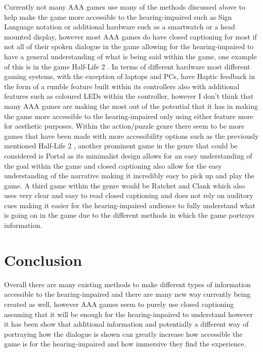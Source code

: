 \documentclass{scrartcl}
\begin{document}
Currently not many AAA games use many of the methods discussed above to help make the game more accessible to the hearing-impaired such as Sign Language notation or additional hardware such as a smartwatch or a head mounted display, however most AAA games do have closed captioning for most if not all of their spoken dialogue in the game allowing for the hearing-impaired to have a general understanding of what is being said within the game, one example of this is in the game Half-Life 2 \cite{Coutinho}. In terms of different hardware most different gaming systems, with the exception of laptops and PCs, have Haptic feedback in the form of a rumble feature built within its controllers also with additional features such as coloured LEDs within the controller, however I don’t think that many AAA games are making the most out of the potential that it has in making the game more accessible to the hearing-impaired only using either feature more for aesthetic purposes. Within the action/puzzle genre there seem to be more games that have been made with more accessibility options such as the previously mentioned Half-Life 2 \cite{Coutinho}, another prominent game in the genre that could be considered is Portal as its minimalist design allows for an easy understanding of the goal within the game and closed captioning also allow for the easy understanding of the narrative making it incredibly easy to pick up and play the game. A third game within the genre would be Ratchet and Clank which also uses very clear and easy to read closed captioning and does not rely on auditory cues making it easier for the hearing-impaired audience to fully understand what is going on in the game due to the different methods in which the game portrays information.

\section{Conclusion}

Overall there are many existing methods to make different types of information accessible to the hearing-impaired and there are many new way currently being created as well, however AAA games seem to purely use closed captioning assuming that it will be enough for the hearing-impaired to understand however it has been show that additional information and potentially a different way of portraying how the dialogue is shown can greatly increase how accessible the game is for the hearing-impaired and how immersive they find the experience.



\end{document}
